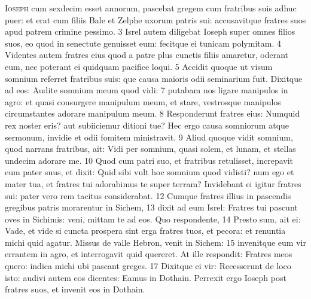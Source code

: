 \begin{multicols*}{2}
\lettrine[lines=2]{\zallmancaps \color{Red} I}{oseph} cum sexdecim esset annorum, pascebat gregem cum fratribus suis adhuc puer: et erat cum filiis Bale et Zelphe uxorum patris sui: accusavitque fratres suos apud patrem crimine pessimo. 3 Isrel autem diligebat Ioseph super omnes filios suos, eo quod in senectute genuisset eum: fecitque ei tunicam polymitam. 4 Videntes autem fratres eius quod a patre plus cunctis filiis amaretur, oderant eum, nec poterant ei quidquam pacifice loqui. 5 Accidit quoque ut visum somnium referret fratribus suis: que causa maioris odii seminarium fuit. Dixitque ad eos: Audite somnium meum quod vidi: 7 putabam nos ligare manipulos in agro: et quasi consurgere manipulum meum, et stare, vestrosque manipulos circumstantes adorare manipulum meum. 8 Responderunt fratres eius: Numquid rex noster eris? aut subiiciemur ditioni tue? Hec ergo causa somniorum atque sermonum, invidie et odii fomitem ministravit. 9 Aliud quoque vidit somnium, quod narrans fratribus, ait: Vidi per somnium, quasi solem, et lunam, et stellas undecim adorare me. 10 Quod cum patri suo, et fratribus retulisset, increpavit eum pater suus, et dixit: Quid sibi vult hoc somnium quod vidisti? num ego et mater tua, et fratres tui adorabimus te super terram? Invidebant ei igitur fratres sui: pater vero rem tacitus considerabat. 12 Cumque fratres illius in pascendis gregibus patris morarentur in Sichem, 13 dixit ad eum Isrel: Fratres tui pascunt oves in Sichimis: veni, mittam te ad eos. Quo respondente, 14 Presto sum, ait ei: Vade, et vide si cuncta prospera sint erga fratres tuos, et pecora: et renuntia michi quid agatur. Missus de valle Hebron, venit in Sichem: 15 invenitque eum vir errantem in agro, et interrogavit quid quereret. At ille respondit: Fratres meos quero: indica michi ubi pascant greges. 17 Dixitque ei vir: Recesserunt de loco isto: audivi autem eos dicentes: Eamus in Dothain. Perrexit ergo Ioseph post fratres suos, et invenit eos in Dothain.

\end{multicols*}
